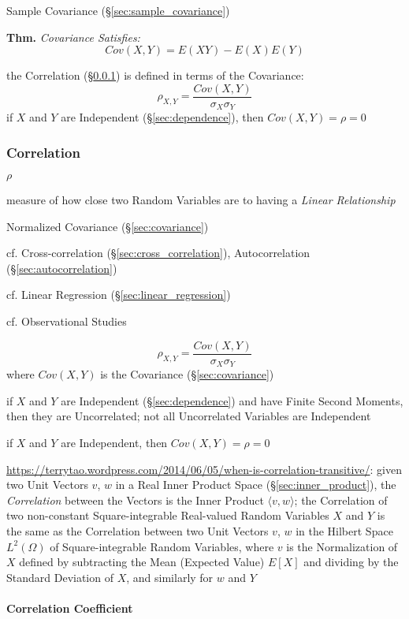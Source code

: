 \fist Sample Covariance (\S\ref{sec:sample_covariance})

\textbf{Thm.} \emph{Covariance Satisfies:
  \[
    Cov(X,Y) = E(XY) - E(X)E(Y)
  \]
}

the Correlation (\S\ref{sec:statistical_correlation}) is defined in terms of the
Covariance:
\[
  \rho_{X,Y} = \frac{Cov(X,Y)}{\sigma_X \sigma_Y}
\]
if $X$ and $Y$ are Independent (\S\ref{sec:dependence}), then
$Cov(X,Y) = \rho = 0$



\subsubsection{Correlation}\label{sec:statistical_correlation}

$\rho$

measure of how close two Random Variables are to having a \emph{Linear
  Relationship}

Normalized Covariance (\S\ref{sec:covariance})

\fist cf. Cross-correlation (\S\ref{sec:cross_correlation}), Autocorrelation
(\S\ref{sec:autocorrelation})

\fist cf. Linear Regression (\S\ref{sec:linear_regression})

cf. Observational Studies

\[
  \rho_{X,Y} = \frac{Cov(X,Y)}{\sigma_X \sigma_Y}
\]
where $Cov(X,Y)$ is the Covariance (\S\ref{sec:covariance})

if $X$ and $Y$ are Independent (\S\ref{sec:dependence}) and have Finite Second
Moments, then they are Uncorrelated; not all Uncorrelated Variables are
Independent

if $X$ and $Y$ are Independent, then $Cov(X,Y) = \rho = 0$

\url{https://terrytao.wordpress.com/2014/06/05/when-is-correlation-transitive/}:
given two Unit Vectors $v$, $w$ in a Real Inner Product Space
(\S\ref{sec:inner_product}), the \emph{Correlation} between the Vectors is the
Inner Product $\langle{v,w}\rangle$; the Correlation of two non-constant
Square-integrable Real-valued Random Variables $X$ and $Y$ is the same as the
Correlation between two Unit Vectors $v$, $w$ in the Hilbert Space $L^2(\Omega)$
of Square-integrable Random Variables, where $v$ is the Normalization of $X$
defined by subtracting the Mean (Expected Value) $E[X]$ and dividing by the
Standard Deviation of $X$, and similarly for $w$ and $Y$



\paragraph{Correlation Coefficient}\label{sec:correlation_coefficient}\hfill

